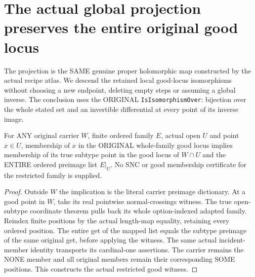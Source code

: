 \section{The actual global projection preserves the entire original good locus}

The projection is the SAME genuine proper holomorphic map constructed by
the actual recipe atlas. We descend the retained local good-locus
isomorphisms without choosing a new endpoint, deleting empty steps or
assuming a global inverse. The conclusion uses the ORIGINAL
\texttt{IsIsomorphismOver}: bijection over the whole stated set and an
invertible differential at every point of its inverse image.

\begin{theorem}
\label{hir:sharp-actual-original-good-open-restriction}
\leanok
For ANY original carrier $W$, finite ordered family $E$, actual open $U$
and point $x\in U$, membership of $x$ in the ORIGINAL whole-family good
locus implies membership of its true subtype point in the good locus
of $W\cap U$ and the ENTIRE ordered preimage list $E|_U$. No SNC or good
membership certificate for the restricted family is supplied.
\end{theorem}
\begin{proof}
Outside $W$ the implication is the literal carrier preimage dictionary.
At a good point in $W$, take its real pointwise normal-crossings witness.
The true open-subtype coordinate theorem pulls back its whole
option-indexed adapted family. Reindex finite positions by the actual
length-map equality, retaining every ordered position. The entire get
of the mapped list equals the subtype preimage of the same original
get, before applying the witness. The same actual incident-member
identity transports its cardinal-one assertions. The carrier remains
the NONE member and all original members remain their corresponding
SOME positions. This constructs the actual restricted good witness.
\end{proof}

